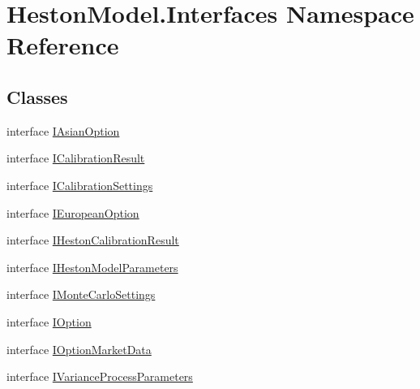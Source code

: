 \hypertarget{namespace_heston_model_1_1_interfaces}{}\section{Heston\+Model.\+Interfaces Namespace Reference}
\label{namespace_heston_model_1_1_interfaces}
\subsection*{Classes}
\begin{DoxyCompactItemize}
\item 
interface \mbox{\hyperlink{interface_heston_model_1_1_interfaces_1_1_i_asian_option}{I\+Asian\+Option}}
\item 
interface \mbox{\hyperlink{interface_heston_model_1_1_interfaces_1_1_i_calibration_result}{I\+Calibration\+Result}}
\item 
interface \mbox{\hyperlink{interface_heston_model_1_1_interfaces_1_1_i_calibration_settings}{I\+Calibration\+Settings}}
\item 
interface \mbox{\hyperlink{interface_heston_model_1_1_interfaces_1_1_i_european_option}{I\+European\+Option}}
\item 
interface \mbox{\hyperlink{interface_heston_model_1_1_interfaces_1_1_i_heston_calibration_result}{I\+Heston\+Calibration\+Result}}
\item 
interface \mbox{\hyperlink{interface_heston_model_1_1_interfaces_1_1_i_heston_model_parameters}{I\+Heston\+Model\+Parameters}}
\item 
interface \mbox{\hyperlink{interface_heston_model_1_1_interfaces_1_1_i_monte_carlo_settings}{I\+Monte\+Carlo\+Settings}}
\item 
interface \mbox{\hyperlink{interface_heston_model_1_1_interfaces_1_1_i_option}{I\+Option}}
\item 
interface \mbox{\hyperlink{interface_heston_model_1_1_interfaces_1_1_i_option_market_data}{I\+Option\+Market\+Data}}
\item 
interface \mbox{\hyperlink{interface_heston_model_1_1_interfaces_1_1_i_variance_process_parameters}{I\+Variance\+Process\+Parameters}}
\end{DoxyCompactItemize}
